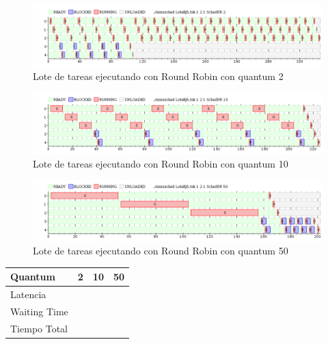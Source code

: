 


\begin{figure}[H]
\caption{Lote de tareas ejecutando con Round Robin con quantum 2}
\label{fig:ej5q2}
\includegraphics[width=1\textwidth]{imgs/ej5-q2.png}
\end{figure}


\begin{figure}[H]
\caption{Lote de tareas ejecutando con Round Robin con quantum 10}
\label{fig:ej5q10}
\includegraphics[width=1\textwidth]{imgs/ej5-q10.png}
\end{figure}


\begin{figure}[H]
\caption{Lote de tareas ejecutando con Round Robin con quantum 50}
\label{fig:ej5q50}
\includegraphics[width=1\textwidth]{imgs/ej5-q50.png}
\end{figure}

\begin{tabular}{| l | c | c | c |}
\hline  
\textbf{Quantum} & \textbf{2} & \textbf{10} & \textbf{50} \\ \hline
Latencia &  &  &  \\ \hline
Waiting Time &  &  &  \\ \hline
Tiempo Total &  &  &  \\ \hline
\end{tabular}


